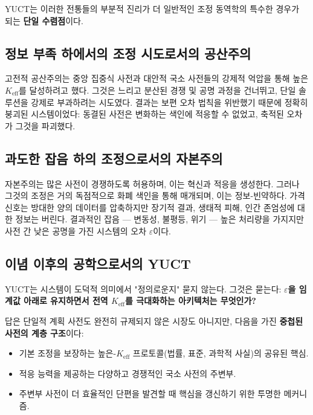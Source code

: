 \documentclass[12pt,a4paper]{article}
\newcommand{\Keff}{K_{\mathrm{eff}}}
\begin{document}
	YUCT는 이러한 전통들의 부분적 진리가 더 일반적인 조정 동역학의 특수한 경우가 되는 \textbf{단일 수렴점}이다.
	
	\subsection{정보 부족 하에서의 조정 시도로서의 공산주의}
	
	고전적 공산주의는 중앙 집중식 사전과 대안적 국소 사전들의 강제적 억압을 통해 높은 \(\Keff\)를 달성하려고 했다. 그것은 느리고 분산된 경쟁 및 공명 과정을 건너뛰고, 단일 솔루션을 강제로 부과하려는 시도였다. 결과는 보편 오차 법칙을 위반했기 때문에 정확히 붕괴된 시스템이었다: 동결된 사전은 변화하는 색인에 적응할 수 없었고, 축적된 오차가 그것을 파괴했다.
	
	\subsection{과도한 잡음 하의 조정으로서의 자본주의}
	
	자본주의는 많은 사전이 경쟁하도록 허용하며, 이는 혁신과 적응을 생성한다. 그러나 그것의 조정은 거의 독점적으로 화폐 색인을 통해 매개되며, 이는 정보-빈약하다. 가격 신호는 방대한 양의 데이터를 압축하지만 장기적 결과, 생태적 피해, 인간 존엄성에 대한 정보는 버린다. 결과적인 잡음 — 변동성, 불평등, 위기 — 높은 처리량을 가지지만 사전 간 낮은 공명을 가진 시스템의 오차 \(\varepsilon\)이다.
	
	\subsection{이념 이후의 공학으로서의 YUCT}
	
	YUCT는 시스템이 도덕적 의미에서 "정의로운지" 묻지 않는다. 그것은 묻는다: \textbf{\(\varepsilon\)을 임계값 아래로 유지하면서 전역 \(K_{\mathrm{eff}}\)를 극대화하는 아키텍처는 무엇인가?}
	
	답은 단일적 계획 사전도 완전히 규제되지 않은 시장도 아니지만, 다음을 가진 \textbf{중첩된 사전의 계층 구조}이다:
	\begin{itemize}[leftmargin=*]
		\item 기본 조정을 보장하는 높은-\(\Keff\) 프로토콜(법률, 표준, 과학적 사실)의 공유된 핵심.
		\item 적응 능력을 제공하는 다양하고 경쟁적인 국소 사전의 주변부.
		\item 주변부 사전이 더 효율적인 단편을 발견할 때 핵심을 갱신하기 위한 투명한 메커니즘.
	\end{itemize}
	
\end{document}
